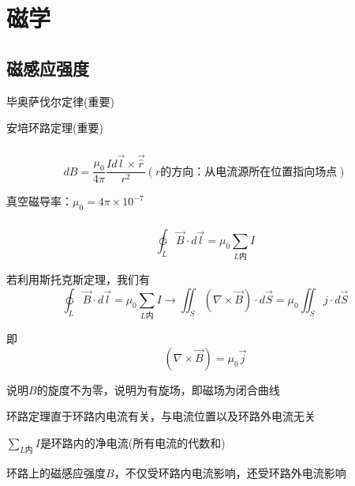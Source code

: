 \documentclass[lang=cn,10pt]{elegantbook}
\begin{document}
	\chapter{磁学}
	\section{磁感应强度}
	\begin{introduction}
		\item 毕奥萨伐尔定律(重要)
		\item 安培环路定理(重要)
	\end{introduction}
	\subsection{\color{red}}
	\begin{theorem}[毕奥萨伐尔定律]
		\begin{equation*}
			dB=\frac{\mu _0}{4\pi}\frac{Id\overrightarrow{l}\times \overrightarrow{\hat{r}}}{r^2}\left( r\text{的方向：从电流源所在位置指向场点} \right) 
		\end{equation*}
	\end{theorem}
	\begin{remark}
		真空磁导率：$\mu _0=4\pi\times 10^{-7}$
	\end{remark}
	\subsection{\color{red}}
	\begin{theorem}
		\begin{equation*}
			\ointctrclockwise_L{\overrightarrow{B}\cdot d\overrightarrow{l}}=\mu _0\sum_{L\text{内}}{I}
		\end{equation*}
	\end{theorem}
	\begin{note}
		若利用斯托克斯定理，我们有
		\begin{equation*}
			\ointctrclockwise_L{\overrightarrow{B}\cdot d\overrightarrow{l}}=\mu _0\sum_{L\text{内}}{I}\rightarrow \iint_S{\left( \nabla \times \overrightarrow{B} \right) \cdot d\overrightarrow{S}}=\mu _0\iint_S{j\cdot d\overrightarrow{S}}
		\end{equation*}
		
		即
		\begin{equation*}
			\left( \nabla \times \overrightarrow{B} \right) =\mu _0\overrightarrow{j}
		\end{equation*}
		
		说明$B$的旋度不为零，说明为有旋场，即磁场为闭合曲线
	\end{note}
	\begin{remark}
		环路定理直于环路内电流有关，与电流位置以及环路外电流无关
	\end{remark}
	\begin{remark}
		$\sum_{L\text{内}}{I}$是环路内的净电流(所有电流的代数和)
	\end{remark}
	\begin{remark}
		环路上的磁感应强度$B$，不仅受环路内电流影响，还受环路外电流影响
	\end{remark}
\end{document}
